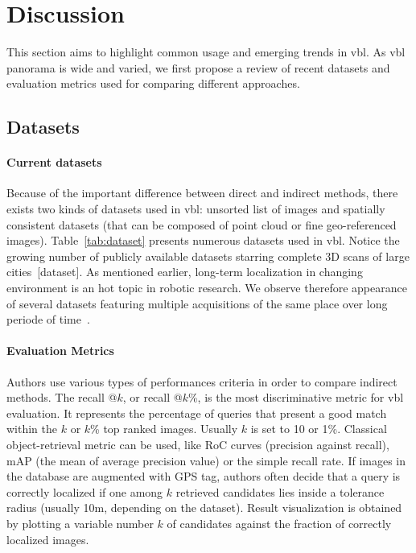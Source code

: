 \section{Discussion}
\label{sec:comparison}
	This section aims to highlight common usage and emerging trends in \ac{vbl}. As \ac{vbl} panorama is wide and varied, we first propose a review of recent datasets and evaluation metrics used for comparing different approaches.
    
	\subsection{Datasets}
		\paragraph{Current datasets} Because of the important difference between direct and indirect methods, there exists two kinds of datasets used in \ac{vbl}: unsorted list of images and spatially consistent datasets (that can be composed of point cloud or fine geo-referenced images). Table~\ref{tab:dataset} presents numerous datasets used in \ac{vbl}. Notice the growing number of publicly available datasets starring complete 3D scans of large cities~[dataset]\citep{Menze2015,Maddern2016,Wang2016Toronto}. As mentioned earlier, long-term localization in changing environment is an hot topic in robotic research. We observe therefore appearance of several datasets featuring multiple acquisitions of the same place over long periode of time~\citep{Maddern2016,Carlevaris-Bianco2016,Krajnik2010,Krajnik2014}.



		\paragraph{Evaluation Metrics}
		\label{subsec:evaluation_metric}
			Authors use various types of performances criteria in order to compare indirect methods. The recall @$k$, or recall @$k$\%, is the most discriminative metric for \ac{vbl} evaluation. It represents the percentage of queries that present a good match within the $k$ or $k$\% top ranked images. Usually $k$ is set to 10 or 1\%. Classical object-retrieval metric can be used, like RoC curves (precision against recall), mAP (the mean of average precision value) or the simple recall rate. If images in the database are augmented with GPS tag, authors often decide that a query is correctly localized if one among $k$ retrieved candidates lies inside a tolerance radius (usually 10m, depending on the dataset). Result visualization is obtained by plotting a variable number $k$ of candidates against the fraction of correctly localized images.
			
